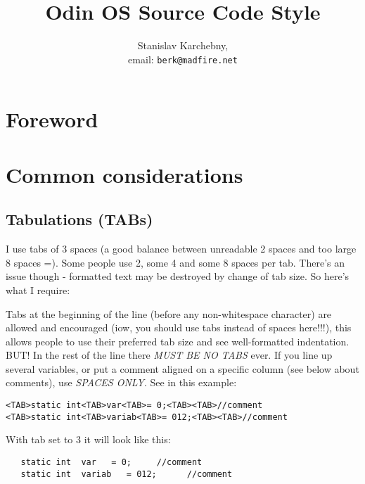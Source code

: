 \documentclass[onecolumn]{article}
\begin{document}
\date{}
\title{\Large\bf Odin OS Source Code Style}
\author{Stanislav Karchebny, \\
        email: \texttt{berk@madfire.net}}
\maketitle



\section{Foreword}



\section{Common considerations}


\subsection{Tabulations (TABs)}

\par I use tabs of 3 spaces (a good balance between unreadable 2 spaces and too large 8 spaces =).
Some people use 2, some 4 and some 8 spaces per tab. There's an issue though - formatted text may
be destroyed by change of tab size. So here's what I require:

\par Tabs at the beginning of the line (before any non-whitespace character) are allowed and encouraged
(iow, you should use tabs instead of spaces here!!!), this allows people to use their preferred tab
size and see well-formatted indentation.
BUT! In the rest of the line there \emph{MUST BE NO TABS} ever. If you line up several variables, or
put a comment aligned on a specific column (see below about comments), use \emph{SPACES ONLY}.
See in this example:

\small
\begin{verbatim}
<TAB>static int<TAB>var<TAB>= 0;<TAB><TAB>//comment
<TAB>static int<TAB>variab<TAB>= 012;<TAB><TAB>//comment
\end{verbatim}
\normalsize

\par With tab set to 3 it will look like this:

\small
\begin{verbatim}
   static int  var   = 0;     //comment
   static int  variab   = 012;      //comment
\end{verbatim}
\normalsize
\end{document}
